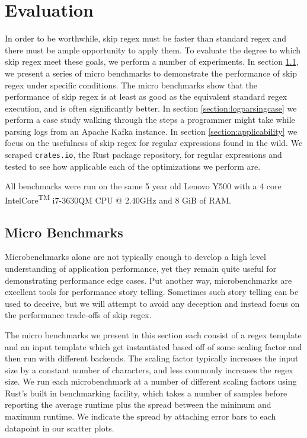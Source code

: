 \chapter{Evaluation}
\label{chapter:evaluation}

In order to be worthwhile, skip regex must be faster than standard
regex and there must be ample opportunity to apply them. To evaluate
the degree to which skip regex meet these goals, we perform a number
of experiments. In section \ref{section:microbenchmarks}, we present a
series of micro benchmarks to demonstrate
the performance of skip regex under specific conditions. The micro
benchmarks show that the performance of skip regex is
at least as good as the equivalent standard regex execution, and 
is often significantly better.
In section \ref{section:logparsingcase} we perform a case study walking
through the steps a programmer might take while parsing logs from
an Apache Kafka instance.
In section \ref{section:applicability} we focus on the usefulness of
skip regex for regular expressions found in the wild. We scraped
\verb'crates.io', the Rust package repository,
for regular expressions and tested to see how applicable each of the 
optimizations we perform are. 

All benchmarks were run
on the same 5 year old Lenovo Y500 with a 4 core
Intel\textregistered Core\textsuperscript{TM} i7-3630QM CPU @
2.40GHz and 8 GiB of RAM.

\section{Micro Benchmarks}
\label{section:microbenchmarks}

Microbenchmarks alone are not typically enough to develop a high
level understanding of application performance, yet they remain
quite useful for demonstrating performance edge cases. Put another
way, microbenchmarks are excellent tools for performance story
telling. Sometimes such story telling can be used to deceive,
but we will attempt to avoid any deception and instead focus
on the performance trade-offs of skip regex.

The micro benchmarks we present in this section each consist of
a regex template and an input template which get instantiated
based off of some scaling factor and then run with different
backends. The scaling factor typically increases the input
size by a constant number of characters, and less commonly
increases the regex size. We run each microbenchmark at a
number of different scaling factors using Rust's built in
benchmarking facility, which takes a number of samples before
reporting the average runtime plus the spread between the minimum
and maximum runtime. We indicate the spread by attaching error bars to
each datapoint in our scatter plots.

